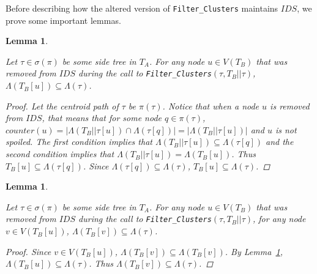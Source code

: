 \documentclass{article}
\newcommand{\leafset}{\Lambda}
\newtheorem{filterclustersremovednodesubset}[incompatibility]{Lemma}
\newtheorem{filterclustersremovednodesubtree}[incompatibility]{Lemma}
\begin{document}
    Before describing how the altered version of \texttt{Filter\_Clusters} maintains $IDS$, we prove some important lemmas.

    \begin{filterclustersremovednodesubset}
        \label{lem:filterclustersremovednodesubset}

        Let $\tau \in \sigma(\pi)$ be some side tree in $T_A$. For any node $u \in V(T_B)$ that was removed from $IDS$ during the call to \texttt{Filter\_Clusters}$(\tau, T_B||\tau)$, $\leafset(T_B[u]) \subseteq \leafset(\tau)$.

        \begin{proof}
            Let the centroid path of $\tau$ be $\pi(\tau)$. Notice that when a node $u$ is removed from $IDS$, that means that for some node $q \in \pi(\tau)$, $counter(u) = |\leafset(T_B||\tau[u]) \cap \leafset(\tau[q])| = |\leafset(T_B||\tau[u])|$ and $u$ is not spoiled. The first condition implies that $\leafset(T_B||\tau[u]) \subseteq \leafset(\tau[q])$ and the second condition implies that $\leafset(T_B||\tau[u]) = \leafset(T_B[u])$. Thus $T_B[u] \subseteq \leafset(\tau[q])$. Since $\leafset(\tau[q]) \subseteq \leafset(\tau)$, $T_B[u] \subseteq \leafset(\tau)$.
        \end{proof}
    \end{filterclustersremovednodesubset}

    \begin{filterclustersremovednodesubtree}
        \label{lem:filterclustersremovednodesubtree}

        Let $\tau \in \sigma(\pi)$ be some side tree in $T_A$. For any node $u \in V(T_B)$ that was removed from $IDS$ during the call to \texttt{Filter\_Clusters}$(\tau, T_B||\tau)$, for any node $v \in V(T_B[u])$, $\leafset(T_B[v]) \subseteq \leafset(\tau)$.

        \begin{proof}
            Since $v \in V(T_B[u])$, $\leafset(T_B[v]) \subseteq \leafset(T_B[v])$. By Lemma~\ref{lem:filterclustersremovednodesubset}, $\leafset(T_B[u]) \subseteq \leafset(\tau)$. Thus $\leafset(T_B[v]) \subseteq \leafset(\tau)$.
        \end{proof}
    \end{filterclustersremovednodesubtree}
\end{document}
